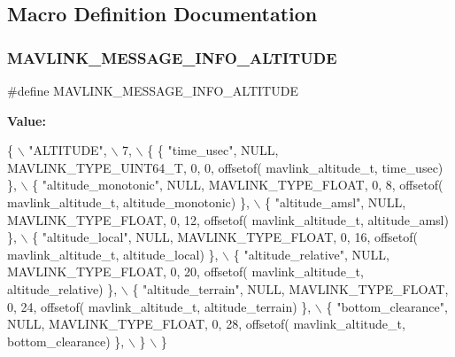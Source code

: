 \subsection{Macro Definition Documentation}
\mbox{\label{mavlink__msg__altitude_8h_ae6dd77363ccf67dc3fa6b1cc0ce36ce9}} 
\subsubsection{M\+A\+V\+L\+I\+N\+K\+\_\+\+M\+E\+S\+S\+A\+G\+E\+\_\+\+I\+N\+F\+O\+\_\+\+A\+L\+T\+I\+T\+U\+DE}
{\footnotesize\ttfamily \#define M\+A\+V\+L\+I\+N\+K\+\_\+\+M\+E\+S\+S\+A\+G\+E\+\_\+\+I\+N\+F\+O\+\_\+\+A\+L\+T\+I\+T\+U\+DE}

{\bfseries Value\+:}
\begin{DoxyCode}
\{ \(\backslash\)
    \textcolor{stringliteral}{"ALTITUDE"}, \(\backslash\)
    7, \(\backslash\)
    \{  \{ \textcolor{stringliteral}{"time\_usec"}, NULL, MAVLINK_TYPE_UINT64_T, 0, 0, offsetof(
      mavlink_altitude_t, time\_usec) \}, \(\backslash\)
         \{ \textcolor{stringliteral}{"altitude\_monotonic"}, NULL, MAVLINK_TYPE_FLOAT, 0, 8, offsetof(
      mavlink_altitude_t, altitude\_monotonic) \}, \(\backslash\)
         \{ \textcolor{stringliteral}{"altitude\_amsl"}, NULL, MAVLINK_TYPE_FLOAT, 0, 12, offsetof(
      mavlink_altitude_t, altitude\_amsl) \}, \(\backslash\)
         \{ \textcolor{stringliteral}{"altitude\_local"}, NULL, MAVLINK_TYPE_FLOAT, 0, 16, offsetof(
      mavlink_altitude_t, altitude\_local) \}, \(\backslash\)
         \{ \textcolor{stringliteral}{"altitude\_relative"}, NULL, MAVLINK_TYPE_FLOAT, 0, 20, offsetof(
      mavlink_altitude_t, altitude\_relative) \}, \(\backslash\)
         \{ \textcolor{stringliteral}{"altitude\_terrain"}, NULL, MAVLINK_TYPE_FLOAT, 0, 24, offsetof(
      mavlink_altitude_t, altitude\_terrain) \}, \(\backslash\)
         \{ \textcolor{stringliteral}{"bottom\_clearance"}, NULL, MAVLINK_TYPE_FLOAT, 0, 28, offsetof(
      mavlink_altitude_t, bottom\_clearance) \}, \(\backslash\)
         \} \(\backslash\)
\}
\end{DoxyCode}
\mbox{\label{mavlink__msg__altitude_8h_a1e9cb7c984b072ffcd35dce6b2b66210}} 
